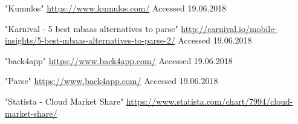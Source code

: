 \documentclass[journal]{IEEEtran}
\begin{document}
\begin{thebibliography}{1}
"Kumulos"
\url{https://www.kumulos.com/}
Accessed 19.06.2018

"Karnival - 5 best \gls{mbaas} alternatives to parse"
\url{http://carnival.io/mobile-insights/5-best-mbaas-alternatives-to-parse-2/}
Accessed 19.06.2018

"back4app"
\url{https://www.back4app.com/}
Accessed 19.06.2018

"Parse"
\url{https://www.back4app.com/}
Accessed 19.06.2018

"Statista - Cloud Market Share"
\url{https://www.statista.com/chart/7994/cloud-market-share/}

\end{thebibliography}

% 






\end{document}
